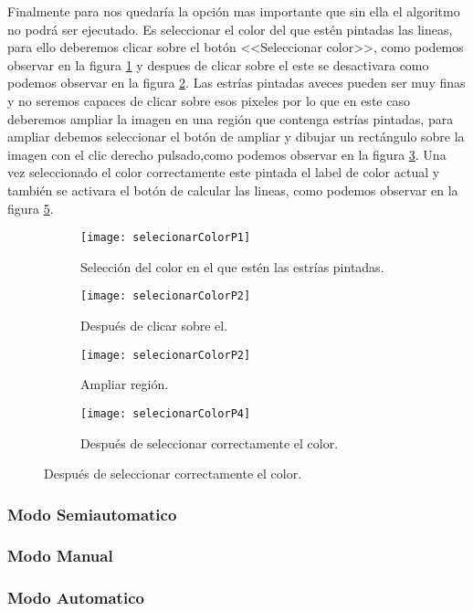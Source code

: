 Finalmente para nos quedaría la opción mas importante que sin ella el algoritmo no podrá ser ejecutado. Es seleccionar el color del que estén pintadas las lineas, para ello deberemos clicar sobre el botón <<Seleccionar color>>, como podemos observar en la figura \ref{fig:selecionarColorP1} y despues de clicar sobre el este se desactivara como podemos observar en la figura \ref{fig:selecionarColorP2}.
Las estrías pintadas aveces pueden ser muy finas y no seremos capaces de clicar sobre esos pixeles por lo que en este caso deberemos ampliar la imagen en una región que contenga estrías pintadas, para ampliar debemos seleccionar el botón de ampliar y dibujar un rectángulo sobre la imagen con el clic derecho pulsado,como podemos observar en la figura \ref{fig:selecionarColorP3}.
Una vez seleccionado el color correctamente este pintada el label de color actual y también se activara el botón de calcular las lineas, como podemos observar en la figura \ref{fig:selecionarColorP4}.



\begin{figure}
	\begin{subfigure}[c]{.5\linewidth}
	\centering\large \texttt{[image: selecionarColorP1]}
	\caption{Selección del color en el que estén las estrías pintadas.}\label{fig:selecionarColorP1}
	\end{subfigure}%
	\begin{subfigure}[c]{.5\linewidth}
	\centering\large \texttt{[image: selecionarColorP2]}
	\caption{Después de clicar sobre el.}
	\label{fig:selecionarColorP2}
	\end{subfigure}%
	
	\begin{subfigure}[c]{.5\linewidth}
	\centering\large \texttt{[image: selecionarColorP2]}
	\caption{Ampliar región.}
	\label{fig:selecionarColorP3}
	\end{subfigure}%
	\begin{subfigure}[c]{.5\linewidth}
	\centering\large \texttt{[image: selecionarColorP4]}
	\caption{Después de seleccionar correctamente el color.}
	\label{fig:selecionarColorP4}
	\end{subfigure}%
\end{figure}




\label{modo:2.1}
\subsubsection{Modo Semiautomatico}

\label{modo:2.2}
\subsubsection{Modo Manual}

\label{modo:2.3}
\subsubsection{Modo Automatico}







